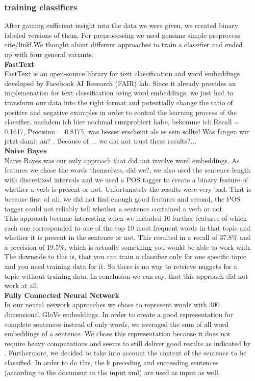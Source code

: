 \subsubsection{training classifiers}
After gaining sufficient insight into the data we were given, we created binary labeled versions of them. For preprocessing we used gensims simple preprocess \lbrack cite/link!\rbrack .We thought about different approaches to train a classifier and ended up with four general variants.\\
\textbf{FastText}\\
FastText \cite{joulin2016bag} is an open-source library for text classification and word embeddings developed by Facebook AI Research (FAIR) lab. Since it already provides an implemenation for text classification using word embeddings, we just had to transform our data into the right format and potentially change the ratio of positive and negative examples in order to control the learning process of the classifier. \lbrack nachdem ich hier nochmal rumprobiert habe, bekomme ich Recall = 0.1617, Precision = 0.8175, was besser erscheint als es sein sollte! Was fangen wir jetzt damit an? \rbrack. Because of ... we did not trust these results?... \\
\textbf{Naive Bayes}\\
Naive Bayes was our only approach that did not involve word embeddings. As features we chose the words themselves, \lbrack did we?\rbrack , we also used the sentence length with discretized intervals and we used a POS tagger to create a binary feature of whether a verb is present or not. Unfortunately the results were very bad. That is because first of all, we did not find enough good features and second, the POS tagger could not reliably tell whether a sentence contained a verb or not.\\
This approach became interesting when we included 10 further features of which each one corresponded to one of the top 10 most frequent words in that topic and whether it is present in the sentence or not. This resulted in a recall of 37.8\% and a precision of 19.5\%, which is actually something you would be able to work with. The downside to this is, that you can train a classifier only for one specific topic and you need training data for it. So there is no way to retrieve nuggets for a topic without training data. In conclusion we can say, that this approach did not work at all.\\
\textbf{Fully Connected Neural Network}\\
In our neural network approaches we chose to represent words with 300 dimensional GloVe embeddings. In order to create a good representation for complete sentences instead of only words, we averaged the sum of all word embeddings of a sentence. We chose this representation because it does not require heavy computations and seems to still deliver good results as indicated by \cite{iyyer2015deep}. Furthermore, we decided to take into account the context of the sentence to be classified. In order to do this, the k preceding and succeeding sentences (according to the document in the input xml) are used as input as well.\\
